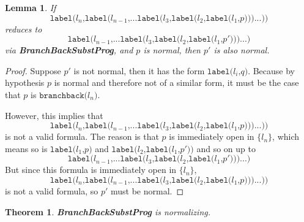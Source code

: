 \documentclass[11pt]{article}
\begin{document}
\newtheorem*{bbspnorecurse}{Lemma}

\begin{bbspnorecurse}
If
$$\texttt{label(}l_{n}\texttt{,}\texttt{label(}l_{n - 1}\texttt{,} ... \texttt{label(}l_{3}\texttt{,} \texttt{label(}l_{2}\texttt{,} \texttt{label(}l_{1}\texttt{,} p\texttt{)}\texttt{)}\texttt{)} ... \texttt{)}\texttt{)}$$ reduces to $$\texttt{label(}l_{n - 1}\texttt{,} ... \texttt{label(}l_{3}\texttt{,} \texttt{label(}l_{2}\texttt{,} \texttt{label(}l_{1}\texttt{,} p'\texttt{)}\texttt{)}\texttt{)} ... \texttt{)}$$ via \textbf{BranchBackSubstProg}, and $p$ is normal, then $p'$ is also normal.
\end{bbspnorecurse}

\begin{proof}
Suppose $p'$ is not normal, then it has the form $\texttt{label(}l_{i}\texttt{,} q\texttt{)}$.  Because by hypothesis $p$ is normal and therefore not of a similar form, it must be the case that $p$ is $\texttt{branchback(}l_{n}\texttt{)}$.

However, this implies that $$\texttt{label(}l_{n}\texttt{,}\texttt{label(}l_{n - 1}\texttt{,} ... \texttt{label(}l_{3}\texttt{,} \texttt{label(}l_{2}\texttt{,} \texttt{label(}l_{1}\texttt{,} p\texttt{)}\texttt{)}\texttt{)} ... \texttt{)}\texttt{)}$$ is not a valid formula.  The reason is that $p$ is immediately open in $\{l_{n}\}$, which means so is $\texttt{label(}l_{1}\texttt{,} p\texttt{)}$ and $\texttt{label(}l_{2}\texttt{,} \texttt{label(}l_{1}\texttt{,} p'\texttt{)}\texttt{)}$ and so on up to $$\texttt{label(}l_{n - 1}\texttt{,} ... \texttt{label(}l_{3}\texttt{,} \texttt{label(}l_{2}\texttt{,} \texttt{label(}l_{1}\texttt{,} p'\texttt{)}\texttt{)}\texttt{)} ... \texttt{)}$$
But since this formula is immediately open in $\{l_{n}\}$, $$\texttt{label(}l_{n}\texttt{,}\texttt{label(}l_{n - 1}\texttt{,} ... \texttt{label(}l_{3}\texttt{,} \texttt{label(}l_{2}\texttt{,} \texttt{label(}l_{1}\texttt{,} p\texttt{)}\texttt{)}\texttt{)} ... \texttt{)}\texttt{)}$$ is not a valid formula, so $p'$ must be normal.
\end{proof}

\newtheorem*{branchbacksubstisnormalizing}{Theorem}
\begin{branchbacksubstisnormalizing}
\textbf{BranchBackSubstProg} is normalizing.
\end{branchbacksubstisnormalizing}
\end{document}
